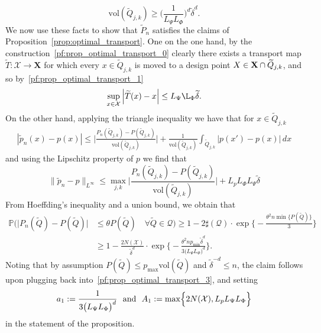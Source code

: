 \documentclass[twoside]{article}
\newcommand{\abs}[1]{\left \lvert #1 \right \rvert}
\newcommand{\vol}{\text{vol}}
\newcommand{\1}{\mathbf{1}}
\newcommand{\Xset}{\mathcal{X}}
\newcommand{\Leb}{L}
\newcommand{\mc}[1]{\mathcal{#1}}
\newcommand{\wt}[1]{\widetilde{#1}}
\theoremstyle{definition}
\theoremstyle{remark}
\begin{document}
\begin{equation}
\label{pf:prop_optimal_transport_2}
\vol(\wt{Q}_{j,k}) \geq \biggl(\frac{1}{L_{\Psi} L_{\Phi}}\biggr)^d \wt{\delta}^d.
\end{equation}
We now use these facts to show that $\wt{P}_n$ satisfies the claims of Proposition~\ref{prop:optimal_transport}. One on the one hand, by the construction~\eqref{pf:prop_optimal_transport_0} clearly there exists a transport map $\wt{T}: \Xset \to \mathbf{X}$ for which every $x \in \wt{Q}_{j,k}$ is moved to a design point $X \in {\bf X} \cap \wt{Q}_{j,k}$, and so by~\eqref{pf:prop_optimal_transport_1}
\begin{equation*}
\sup_{x \in \Xset} \abs{\wt{T}(x) - x} \leq  L_{\Psi} \L_{\Phi} \wt{\delta}.
\end{equation*}
On the other hand, applying the triangle inequality we have that for $x \in \wt{Q}_{j,k}$
\begin{align*}
|\wt{p}_n(x) - p(x)| \leq \biggl|\frac{P_n(\wt{Q}_{j,k}) - P(\wt{Q}_{j,k})}{\vol(\wt{Q}_{j,k})}\biggr| + \frac{1}{\vol(\wt{Q}_{j,k})} \int_{\wt{Q}_{j,k}} |p(x') - p(x)| \,dx 
\end{align*}
and using the Lipschitz property of $p$ we find that 
\begin{equation}
\label{pf:prop_optimal_transport_3}
\|\wt{p}_n - p\|_{\Leb^{\infty}} \leq \max_{j,k} \biggl|\frac{P_n(\wt{Q}_{j,k}) - P(\wt{Q}_{j,k})}{\vol(\wt{Q}_{j,k})}\biggr| + L_p L_{\Phi} L_{\Psi} \wt{\delta}
\end{equation}
From Hoeffding's inequality and a union bound, we obtain that 
\begin{align*}
\mathbb{P}\biggl( \bigl|P_n(\wt{Q}) - P(\wt{Q})\bigr| & \leq \theta P(\wt{Q}) \quad \forall \wt{Q} \in \mc{Q} \biggr) \geq 1 - 2 \sharp(\mc{Q}) \cdot \exp\biggl\{-\frac{\theta^2 n \min \{P(\wt{Q})\}}{3}\biggr\} \\
& \geq 1 - \frac{2 N(\Xset)}{\wt{\delta}^d} \cdot \exp\biggl\{-\frac{\theta^2 n p_{\min} \wt{\delta}^d }{3\bigl(L_{\Psi} L_{\Phi}\bigr)^d}\biggr\}.
\end{align*}
Noting that by assumption $P(\wt{Q}) \leq p_{\max} \vol(\wt{Q})$ and $\wt{\delta}^{-d} \leq n$, the claim follows upon plugging back into~\eqref{pf:prop_optimal_transport_3}, and setting
\begin{equation*}
a_1 := \frac{1}{3\bigl(L_{\Psi} L_{\Phi}\bigr)^d}~~\textrm{and}~~A_1 := \max \Bigl\{2N(\Xset),L_p L_{\Psi} L_{\Phi} \Bigr\}
\end{equation*}
in the statement of the proposition.
\end{document}
